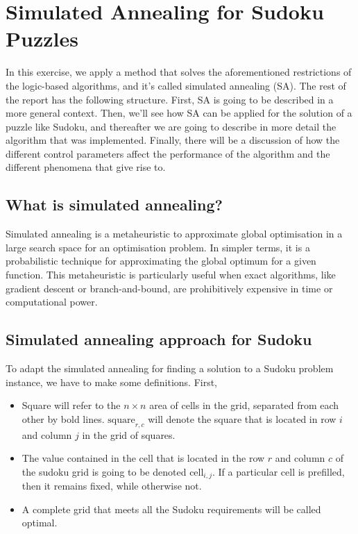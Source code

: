 \documentclass[11pt]{report}
\begin{document}
\section*{Simulated Annealing for Sudoku Puzzles}

In this exercise, we apply a method that solves the aforementioned restrictions of the logic-based algorithms, and it's called simulated annealing (SA). The rest of the report has the following structure. First, SA is going to be described in a more general context. Then, we'll see how SA can be applied for the solution of a puzzle like Sudoku, and thereafter we are going to describe in more detail the algorithm that was implemented. Finally, there will be a discussion of how the different control parameters affect the performance of the algorithm and the different phenomena that give rise to.


\subsection*{What is simulated annealing?}

Simulated annealing is a metaheuristic to approximate global optimisation in a large search space for an optimisation problem. In simpler terms, it is a probabilistic technique for approximating the global optimum for a given function. This metaheuristic is particularly useful when exact algorithms, like gradient descent or branch-and-bound, are prohibitively expensive in time or computational power. 

\subsection*{Simulated annealing approach for Sudoku}

To adapt the simulated annealing for finding a solution to a Sudoku problem instance, we have to make some definitions. First,
\begin{itemize}
	\item Square will refer to the $n\times n$ area of cells in the grid, separated from each other by bold lines. $\text{square}_{r,c}$ will denote the square that is located in row $i$ and column $j$ in the grid of squares.
	\item The value contained in the cell that is located in the row $r$ and column $c$ of the sudoku grid is going to be denoted $\text{cell}_{i,j}$. If a particular cell is prefilled, then it remains fixed, while otherwise not.
	\item  A complete grid that meets all the Sudoku requirements will be called optimal.
\end{itemize}
\end{document}
